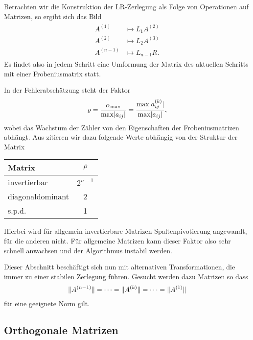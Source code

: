 \begin{intro}
  Betrachten wir die Konstruktion der LR-Zerlegung als Folge von
  Operationen auf Matrizen, so ergibt sich das Bild
  \begin{gather}
    \begin{split}
      A^{(1)} & \mapsto L_{1} A^{(2)} \\
      A^{(2)} & \mapsto L_{2} A^{(3)} \\
      A^{(n-1)} & \mapsto L_{n-1} R.
    \end{split}
  \end{gather}
  Es findet also in jedem Schritt eine Umformung der Matrix des
  aktuellen Schritts mit einer Frobeniusmatrix statt.

  In der Fehlerabschätzung steht der Faktor
  \begin{gather}
    \varrho = \frac{\alpha_{\max}}{\max \lvert a_{ij}\rvert}
    = \frac{\max \lvert a^{(k)}_{ij}\rvert}{\max \lvert a_{ij}\rvert},
  \end{gather}
  wobei das Wachstum der Zähler von den Eigenschaften der
  Frobeniusmatrizen abhängt. Aus \cite{DeuflhardHohmann08} zitieren
  wir dazu folgende Werte abhängig von der Struktur der Matrix
  \begin{center}
    \begin{tabular}{l|c}
      Matrix & $\rho$\\\hline
      invertierbar & $2^{n-1}$ \\
      diagonaldominant & 2 \\
      s.p.d. & 1
    \end{tabular}
  \end{center}
  Hierbei wird für allgemein invertierbare Matrizen Spaltenpivotierung
  angewandt, für die anderen nicht. Für allgemeine Matrizen kann
  dieser Faktor also sehr schnell anwachsen und der Algorithmus
  instabil werden.

  Dieser Abschnitt beschäftigt sich nun mit alternativen
  Transformationen, die immer zu einer stabilen Zerlegung
  führen. Gesucht werden dazu Matrizen so dass
  \begin{gather}
    \lVert A^{(n-1)}\rVert = \dots = \lVert A^{(k)}\rVert = \dots = \lVert A^{(1)}\rVert
  \end{gather}
  für eine geeignete Norm gilt.
\end{intro}

\subsection{Orthogonale Matrizen}

